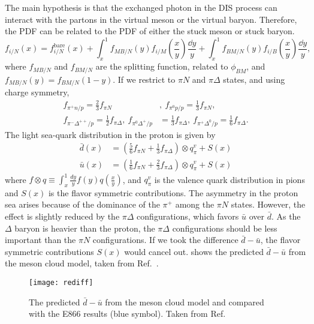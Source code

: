 \documentclass[../main.tex]{subfiles}
\begin{document}
The main hypothesis is that the exchanged photon in the DIS process can interact with the partons in the
virtual meson or the virtual
baryon. Therefore, the PDF can be related to the PDF of either the stuck meson or stuck baryon.
\begin{equation}
	f_{i/N}\left(x\right) = f_{i/N}^{\mathrm{bare}}\left(x\right) +  \int^1_x f_{MB/N}\left(y\right) f_{i/M}\left(\frac{x}{y}\right) \frac{\dd{y}}{y} + \int^1_x f_{BM/N}\left(y\right) f_{i/B}\left(\frac{x}{y}\right) \frac{\dd{y}}{y},
\end{equation}
where $f_{MB/N}$ and $f_{BM/N}$ are the splitting function, related to $\phi_{BM}$, and $f_{MB/N}(y)=f_{BM/N}(1-y)$.
If we restrict to $\pi N$ and $\pi\Delta$ states, and using charge symmetry,
\begin{align}
	f_{\pi^+n/p}=\frac{2}{3} f_{\pi N}                                       & , ~f_{\pi^0 p/p}=\frac{1}{3} f_{\pi N},                                         \\
	f_{\pi^-\Delta^{++}/p}=\frac{1}{2} f_{\pi \Delta}, ~f_{\pi^0 \Delta^+/p} & =\frac{1}{3} f_{\pi \Delta},  ~f_{\pi^+ \Delta^0/p}=\frac{1}{6} f_{\pi \Delta}.
\end{align}
The light sea-quark distribution in the proton is given by
\begin{align}
	\bar{d}(x) & = \left(\frac{5}{6}f_{\pi N} + \frac{1}{3}f_{\pi \Delta}\right)\otimes q^v_\pi + S(x) \\
	\bar{u}(x) & = \left(\frac{1}{6}f_{\pi N} + \frac{2}{3}f_{\pi \Delta}\right)\otimes q^v_\pi + S(x)
	\label{eq:pion_dbub}
\end{align}
where $f\otimes q\equiv \int^1_x \frac{dy}{y}f(y)q\left(\frac{x}{y}\right)$, and $q^v_\pi$ is the valence
quark distribution in pions and $S(x)$ is the flavor symmetric contributions.
The asymmetry in the proton sea arises because of the dominance of the $\pi^+$ among the $\pi N$ states.
However, the effect is slightly reduced by the $\pi\Delta$ configurations, which favors $\bar{u}$ over $\bar{d}$.
As the $\Delta$ baryon is heavier than the proton, the $\pi\Delta$ configurations should be less important than
the $\pi N$ configurations.
If we took the difference $\bar{d}-\bar{u}$, the flavor symmetric contributions $S(x)$ would cancel out.
shows the predicted $\bar{d}-\bar{u}$ from the meson cloud model, taken from Ref.~\cite{alberg2022}.
\begin{figure}
	\centering
	\texttt{[image: rediff]}
	\caption{The predicted $\bar{d}-\bar{u}$ from the meson cloud model and compared with the E866 results (blue symbol). Taken from Ref.~\cite{alberg2022}}
	\label{fig:pion_cloud}
\end{figure}
\end{document}
